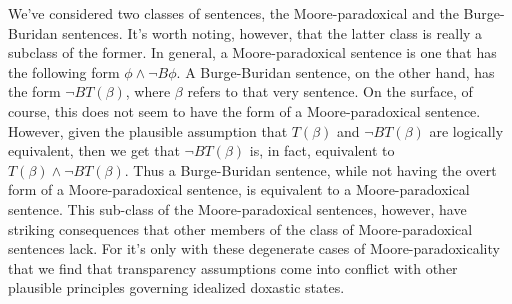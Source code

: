 We've considered two classes of sentences, the Moore-paradoxical and the Burge-Buridan sentences.
It's worth noting, however, that the latter class is really a subclass of the former.
In general, a Moore-paradoxical sentence is one that has the following form $\phi \wedge \lnot B \phi$.
A Burge-Buridan sentence, on the other hand, has the form $\lnot B T(\beta)$, where $\beta$ refers to that very sentence. 
On the surface, of course, this does not seem to have the form of a Moore-paradoxical sentence.
However, given the plausible assumption that $T(\beta)$ and $\lnot B T(\beta)$ are logically equivalent, then we get that $\lnot B T(\beta)$ is, in fact, equivalent to $T(\beta) \wedge \lnot B T(\beta)$.
Thus a Burge-Buridan sentence, while not having the overt form of a Moore-paradoxical sentence, is equivalent to a Moore-paradoxical sentence.
This sub-class of the Moore-paradoxical sentences, however, have striking consequences that other members of the class of Moore-paradoxical sentences lack.
For it's only with these degenerate cases of Moore-paradoxicality that we find that transparency assumptions come into conflict with other plausible principles governing idealized doxastic states.







